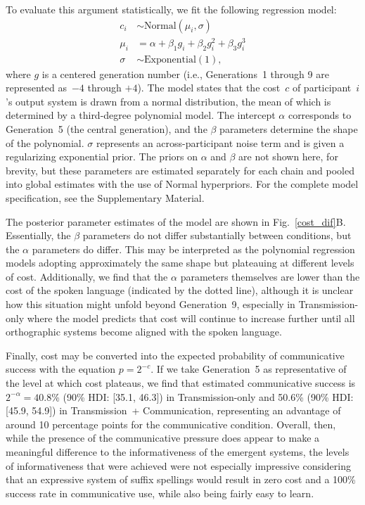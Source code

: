 \documentclass[doc,biblatex]{apa7}
\begin{document}
To evaluate this argument statistically, we fit the following regression model:
	\begin{equation}
	\begin{aligned}
	   c_i & \sim \mathrm{Normal}(\mu_i, \sigma) \\
	 \mu_i & =    \alpha + \beta_1 g_i + \beta_2 g_i^2 + \beta_3 g_i^3 \\
	\sigma & \sim \mathrm{Exponential}(1),
	\end{aligned}
	\end{equation}
where $g$ is a centered generation number (i.e., Generations~1 through 9 are represented as~$-4$ through $+4$). The model states that the cost~$c$ of participant~$i$'s output system is drawn from a normal distribution, the mean of which is determined by a third-degree polynomial model. The intercept $\alpha$ corresponds to Generation~5 (the central generation), and the $\beta$ parameters determine the shape of the polynomial. $\sigma$ represents an across-participant noise term and is given a regularizing exponential prior. The priors on $\alpha$ and $\beta$ are not shown here, for brevity, but these parameters are estimated separately for each chain and pooled into global estimates with the use of Normal hyperpriors. For the complete model specification, see the Supplementary Material.

The posterior parameter estimates of the model are shown in Fig.~\ref{cost_dif}B. Essentially, the $\beta$ parameters do not differ substantially between conditions, but the $\alpha$ parameters do differ. This may be interpreted as the polynomial regression models adopting approximately the same shape but plateauing at different levels of cost. Additionally, we find that the $\alpha$ parameters themselves are lower than the cost of the spoken language (indicated by the dotted line), although it is unclear how this situation might unfold beyond Generation~9, especially in Transmission-only where the model predicts that cost will continue to increase further until all orthographic systems become aligned with the spoken language.

Finally, cost may be converted into the expected probability of communicative success with the equation $p=2^{-c}$. If we take Generation~5 as representative of the level at which cost plateaus, we find that estimated communicative success is $2^{-\alpha} = 40.8$\% (90\% HDI: [35.1, 46.3]) in Transmission-only and 50.6\% (90\% HDI: [45.9, 54.9]) in Transmission~+ Communication, representing an advantage of around 10 percentage points for the communicative condition. Overall, then, while the presence of the communicative pressure does appear to make a meaningful difference to the informativeness of the emergent systems, the levels of informativeness that were achieved were not especially impressive considering that an expressive system of suffix spellings would result in zero cost and a 100\% success rate in communicative use, while also being fairly easy to learn.
\end{document}
